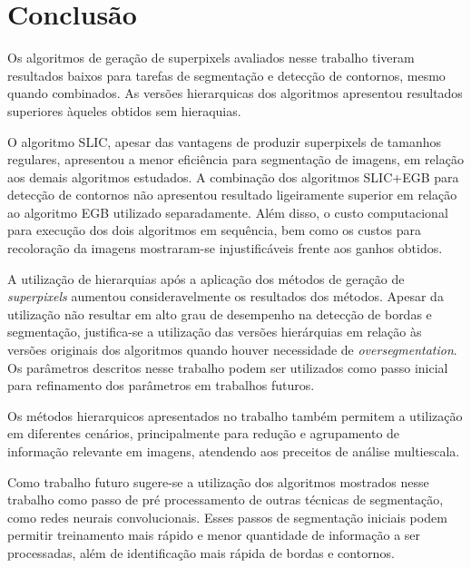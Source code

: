 \begin{document}
\section{Conclusão} \label{sec:conclusao}

Os algoritmos de geração de superpixels avaliados nesse trabalho tiveram resultados baixos para tarefas de segmentação e detecção de contornos, mesmo quando combinados. As versões hierarquicas dos algoritmos apresentou resultados superiores àqueles obtidos sem hieraquias.

O algoritmo SLIC, apesar das vantagens de produzir superpixels de tamanhos regulares, apresentou a menor eficiência para segmentação de imagens, em relação aos demais algoritmos estudados. A combinação dos algoritmos SLIC+EGB para detecção de contornos não apresentou resultado ligeiramente  superior em relação ao algoritmo EGB utilizado separadamente. Além disso, o custo computacional para execução dos dois algoritmos em sequência, bem como os custos para recoloração da imagens mostraram-se injustificáveis frente aos ganhos obtidos.

A utilização de hierarquias após a aplicação dos métodos de geração de \textit{superpixels} aumentou consideravelmente os resultados dos métodos. Apesar da utilização não resultar em alto grau de desempenho na detecção de bordas e segmentação, justifica-se a utilização das versões hierárquias em relação às versões originais dos algoritmos quando houver necessidade de \textit{oversegmentation}. Os parâmetros descritos nesse trabalho podem ser utilizados como passo inicial para refinamento dos parâmetros em trabalhos futuros.

Os métodos hierarquicos apresentados no trabalho também permitem a utilização em diferentes cenários, principalmente para redução e agrupamento de informação relevante em imagens, atendendo aos preceitos de análise multiescala.

Como trabalho futuro sugere-se a utilização dos algoritmos mostrados nesse trabalho como passo de pré processamento de outras técnicas de segmentação, como redes neurais convolucionais. Esses passos de segmentação iniciais podem permitir treinamento mais rápido e menor quantidade de informação a ser processadas, além de identificação mais rápida de bordas e contornos.




\end{document}
